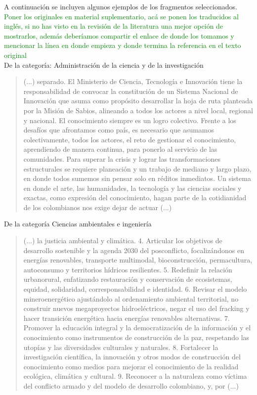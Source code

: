 \documentclass[11pt,a4paper]{article}
\begin{document}
	 
	
	A  continuación se incluyen algunos ejemplos de los fragmentos seleccionados. \textcolor{green}{Poner los originales en material suplementario, acá se ponen los traducidos al inglés, si no has visto en la revisión de la literatura una mejor opción de mostrarlos, además deberíamos compartir el enlace de donde los tomamos y mencionar la línea en donde empieza y donde termina la referencia en el texto original}\\
	 
	
	De la categoría: Administración de la ciencia y de la investigación
	
	\begin{quote}
		(...) separado. El Ministerio de Ciencia, Tecnología e Innovación tiene la responsabilidad de convocar la constitución de un Sistema Nacional de Innovación que asuma como propósito desarrollar la hoja de ruta planteada por la Misión de Sabios, alineando a todos los actores a nivel local, regional y nacional. El conocimiento siempre es un logro colectivo. Frente a los desafíos que afrontamos como país, es necesario que asumamos colectivamente, todos los actores, el reto de gestionar el conocimiento, aprendiendo de manera continua, para ponerlo al servicio de las comunidades. Para superar la crisis y lograr las transformaciones estructurales se requiere planeación y un trabajo de mediano y largo plazo, en donde todos sumemos sin pensar solo en réditos inmediatos. Un sistema en donde el arte, las humanidades, la tecnología y las ciencias sociales y exactas, como expresión del conocimiento, hagan parte de la cotidianidad de los colombianos nos exige dejar de actuar (...)
	\end{quote}
	
	De la categoría Ciencias ambientales e ingeniería
	
	\begin{quote}
		(...) la justicia ambiental y climática. 4. Articular los objetivos de desarrollo sostenible y la agenda 2030 del posconflicto, focalizándonos en energías renovables, transporte multimodal, bioconstrucción, permacultura, autoconsumo y territorios hídricos resilientes. 5. Redefinir la relación urbanorural, enfatizando restauración y conservación de ecosistemas, equidad, solidaridad, corresponsabilidad e identidad. 6. Revisar el modelo mineroenergético ajustándolo al ordenamiento ambiental territorial, no construir nuevos megaproyectos hidroeléctricos, negar el uso del fracking y hacer transición energética hacia energías renovables alternativas. 7. Promover la educación integral y la democratización de la información y el conocimiento como instrumentos de construcción de la paz, respetando las utopías y las diversidades culturales y naturales. 8. Fortalecer la investigación científica, la innovación y otros modos de construcción del conocimiento como medios para mejorar el conocimiento de la realidad ecológica, climática y cultural. 9. Reconocer a la naturaleza como víctima del conflicto armado y del modelo de desarrollo colombiano, y, por (...)
	\end{quote}
	
\end{document}
